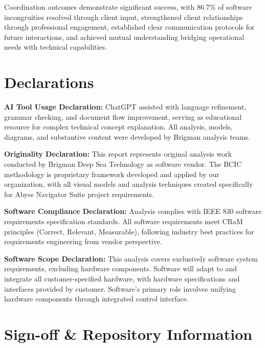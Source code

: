\documentclass[12pt,a4paper]{article}
\begin{document}
Coordination outcomes demonstrate significant success, with 86.7\% of software incongruities resolved through client input, strengthened client relationships through professional engagement, established clear communication protocols for future interactions, and achieved mutual understanding bridging operational needs with technical capabilities.

\newpage
\section{Declarations}
\label{sec:declarations}

\textbf{AI Tool Usage Declaration:} ChatGPT assisted with language refinement, grammar checking, and document flow improvement, serving as educational resource for complex technical concept explanation. All analysis, models, diagrams, and substantive content were developed by Brigman analysis teams.

\textbf{Originality Declaration:} This report represents original analysis work conducted by Brigman Deep Sea Technology as software vendor. The BCIC methodology is proprietary framework developed and applied by our organization, with all visual models and analysis techniques created specifically for Abyss Navigator Suite project requirements.

\textbf{Software Compliance Declaration:} Analysis complies with IEEE 830 software requirements specification standards. All software requirements meet CRaM principles (Correct, Relevant, Measurable), following industry best practices for requirements engineering from vendor perspective.

\textbf{Software Scope Declaration:} This analysis covers exclusively software system requirements, excluding hardware components. Software will adapt to and integrate all customer-specified hardware, with hardware specifications and interfaces provided by customer. Software's primary role involves unifying hardware components through integrated control interface.

\vspace{1cm}

\section*{Sign-off \& Repository Information}
\end{document}
